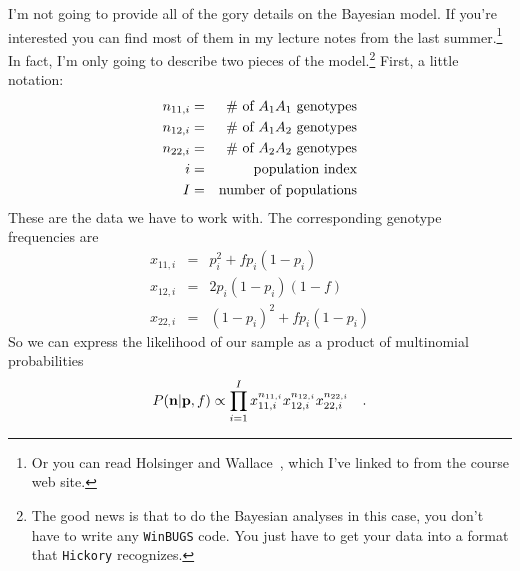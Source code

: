 \documentclass[12pt]{article}
\begin{document}
I'm not going to provide all of the gory details on the Bayesian
model. If you're interested you can find most of them in my lecture
notes from the 
last summer.\footnote{Or you can read Holsinger and
  Wallace~\cite{Holsinger-Wallace-2004}, which I've linked to from the
  course web site.} In fact, I'm only going to describe two pieces of
the model.\footnote{The good news is that to do the Bayesian analyses
  in this case, you don't have to write any {\tt WinBUGS} code. You
  just have to get your data into a format that {\tt Hickory}
  recognizes.} First, a little notation:
\begin{eqnarray*}
n_{11,i} &=& \hbox{\# of $A_1A_1$ genotypes} \\
n_{12,i} &=& \hbox{\# of $A_1A_2$ genotypes} \\
n_{22,i} &=& \hbox{\# of $A_2A_2$ genotypes} \\
i         &=& \hbox{population index} \\
I         &=& \hbox{number of populations} \\
\end{eqnarray*}
These are the data we have to work with. The corresponding genotype
frequencies are
\begin{eqnarray*}
x_{11,i} &=& p_{i}^2 + fp_{i}(1-p_{i}) \\
x_{12,i} &=& 2p_{i}(1-p_{i})(1-f) \\
x_{22,i} &=& (1-p_{i})^2 + fp_{i}(1-p_{i})
\end{eqnarray*}
So we can express the likelihood of our sample as a product of
multinomial probabilities
\[
P({\bf n}|{\bf p},f) \propto \prod_{i=1}^I x_{11,i}^{n_{11,i}}
x_{12,i}^{n_{12,i}} x_{22,i}^{n_{22,i}} \quad .
\]
\end{document}

